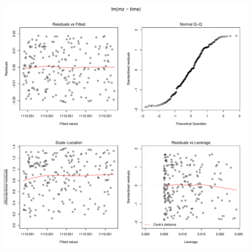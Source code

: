 \documentclass[]{article}
\begin{document}
\includegraphics{Supplementary_document_files/figure-latex/fit.lin.1110-1.pdf}
\end{document}
